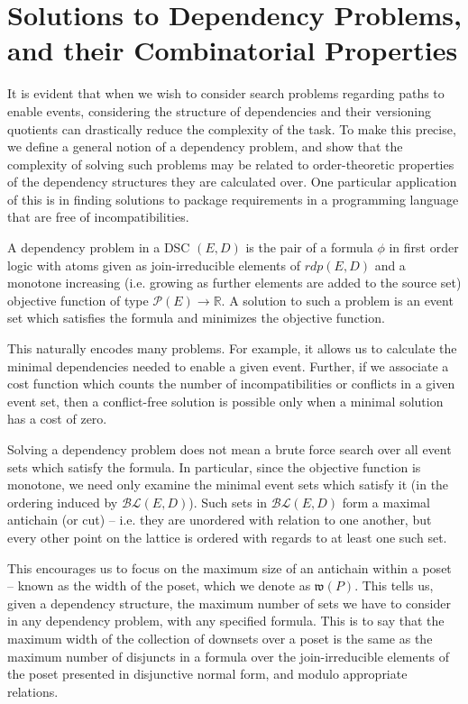 \documentclass[a4paper,USenglish,cleveref, autoref, thm-restate,authorcolumns]{lipics-v2019}
\newcommand{\Pc}{\mathcal{P}}
\newcommand{\BLc}{\mathcal{BL}}
\newcommand{\Wf}{\mathfrak{w}}
\begin{document}
\section{Solutions to Dependency Problems, and their Combinatorial Properties}
It is evident that when we wish to consider search problems regarding paths to enable events, considering the structure of dependencies and their versioning quotients can drastically reduce the complexity of the task. To make this precise, we define a general notion of a dependency problem, and show that the complexity of solving such problems may be related to order-theoretic properties of the dependency structures they are calculated over. One particular application of this is in finding solutions to package requirements in a programming language that are free of incompatibilities.

\begin{definition}
A dependency problem in a DSC \((E,D)\) is the pair of a formula \(\phi\) in first order logic with atoms given as join-irreducible elements of \(rdp(E,D)\) and a monotone increasing (i.e. growing as further elements are added to the source set) objective function of type \(\Pc(E) \rightarrow \mathbb{R}\). A solution to such a problem is an event set which satisfies the formula and minimizes the objective function.
\end{definition}

This naturally encodes many problems. For example, it allows us to calculate the minimal dependencies needed to enable a given event. Further, if we associate a cost function which counts the number of incompatibilities or conflicts in a given event set, then a conflict-free solution is possible only when a minimal solution has a cost of zero.

Solving a dependency problem does not mean a brute force search over all event sets which satisfy the formula. In particular, since the objective function is monotone, we need only examine the minimal event sets which satisfy it (in the ordering induced by \(\BLc(E,D)\)). Such sets in \(\BLc(E,D)\) form a maximal  antichain (or cut) -- i.e. they are unordered with relation to one another, but every other point on the lattice is ordered with regards to at least one such set.

This encourages us to focus on the maximum size of an antichain within a poset -- known as the width of the poset, which we denote as \(\Wf(P)\). This tells us, given a dependency structure, the maximum number of sets we have to consider in any dependency problem, with any specified formula. This is to say that the maximum width of the collection of downsets over a poset is the same as the maximum number of disjuncts in a formula over the join-irreducible elements of the poset presented in disjunctive normal form, and modulo appropriate relations.  
\end{document}
